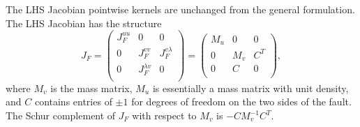 The LHS Jacobian pointwise kernels are unchanged from the general
formulation. The LHS Jacobian has the structure
\begin{equation}
J_F = \left(
  \begin{array}{ccc}
    J_F^{uu} & 0 & 0 \\
    0 & J_F^{vv} & J_F^{v \lambda} \\
    0 & J_F^{\lambda v} & 0 \\
  \end{array} \right)
  = \left(
  \begin{array}{ccc}
    M_u & 0 & 0 \\
    0 & M_v & C^T \\
    0 & C & 0 \\
  \end{array} \right),
\end{equation}
where $M_v$ is the mass matrix, $M_u$ is essentially a mass matrix
with unit density, and $C$ contains entries of $\pm 1$ for degrees of
freedom on the two sides of the fault. The Schur complement of $J_F$
with respect to $M_v$ is $-CM_v^{-1}C^T$.


